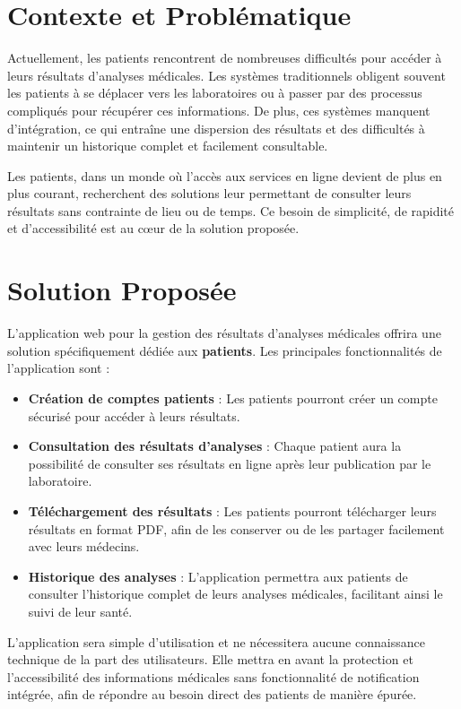 \documentclass[12pt,a4paper]{report}
\begin{document}
\section{Contexte et Problématique}
Actuellement, les patients rencontrent de nombreuses difficultés pour accéder à leurs résultats d'analyses médicales. Les systèmes traditionnels obligent souvent les patients à se déplacer vers les laboratoires ou à passer par des processus compliqués pour récupérer ces informations. De plus, ces systèmes manquent d'intégration, ce qui entraîne une dispersion des résultats et des difficultés à maintenir un historique complet et facilement consultable.

Les patients, dans un monde où l'accès aux services en ligne devient de plus en plus courant, recherchent des solutions leur permettant de consulter leurs résultats sans contrainte de lieu ou de temps. Ce besoin de simplicité, de rapidité et d'accessibilité est au cœur de la solution proposée.

\section{Solution Proposée}
L'application web pour la gestion des résultats d'analyses médicales offrira une solution spécifiquement dédiée aux \textbf{patients}. Les principales fonctionnalités de l'application sont :

\begin{itemize}
    \item \textbf{Création de comptes patients} : Les patients pourront créer un compte sécurisé pour accéder à leurs résultats.
    \item \textbf{Consultation des résultats d'analyses} : Chaque patient aura la possibilité de consulter ses résultats en ligne après leur publication par le laboratoire.
    \item \textbf{Téléchargement des résultats} : Les patients pourront télécharger leurs résultats en format PDF, afin de les conserver ou de les partager facilement avec leurs médecins.
    \item \textbf{Historique des analyses} : L'application permettra aux patients de consulter l'historique complet de leurs analyses médicales, facilitant ainsi le suivi de leur santé.
\end{itemize}

L'application sera simple d'utilisation et ne nécessitera aucune connaissance technique de la part des utilisateurs. Elle mettra en avant la protection et l'accessibilité des informations médicales sans fonctionnalité de notification intégrée, afin de répondre au besoin direct des patients de manière épurée.
\end{document}
